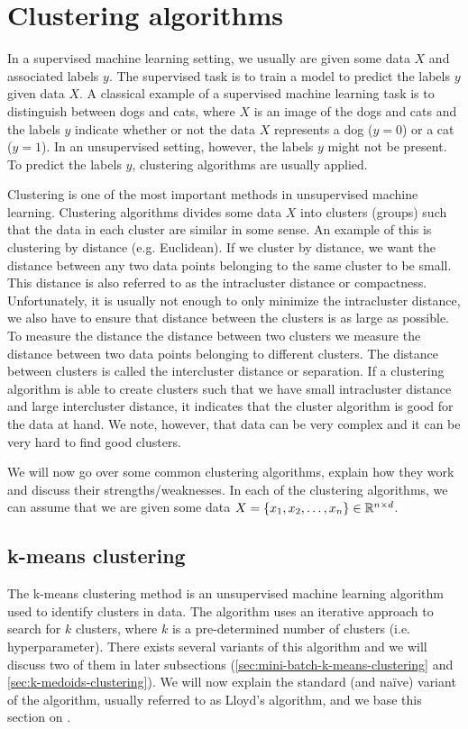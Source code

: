 \section{Clustering algorithms}
\label{sec:clustering-algorithms}
In a supervised machine learning setting, we usually are given some data $X$ and associated labels $y$. The supervised task is to train a model to predict the labels $y$ given data $X$. A classical example of a supervised machine learning task is to distinguish between dogs and cats, where $X$ is an image of the dogs and cats and the labels $y$ indicate whether or not the data $X$ represents a dog ($y=0$) or a cat ($y=1$). In an unsupervised setting, however, the labels $y$ might not be present. To predict the labels $y$, clustering algorithms are usually applied.

Clustering is one of the most important methods in unsupervised machine learning. Clustering algorithms divides some data $X$ into clusters (groups) such that the data in each cluster are similar in some sense. An example of this is clustering by distance (e.g. Euclidean). If we cluster by distance, we want the distance between any two data points belonging to the same cluster to be small. This distance is also referred to as the intracluster distance or compactness. Unfortunately, it is usually not enough to only minimize the intracluster distance, we also have to ensure that distance between the clusters is as large as possible. To measure the distance the distance between two clusters we measure the distance between two data points belonging to different clusters. The distance between clusters is called the intercluster distance or separation. If a clustering algorithm is able to create clusters such that we have small intracluster distance and large intercluster distance, it indicates that the cluster algorithm is good for the data at hand. We note, however, that data can be very complex and it can be very hard to find good clusters.

We will now go over some common clustering algorithms, explain how they work and discuss their strengths/weaknesses. In each of the clustering algorithms, we can assume that we are given some data $X = \left\{x_1, x_2, \ldots, x_n\right\} \in \mathbb{R}^{n \times d}$.

\subsection{k-means clustering}
\label{sec:k-means-clustering}
The k-means clustering method \cite[Section 9.1]{bishop2006} is an unsupervised machine learning algorithm used to identify clusters in data. The algorithm uses an iterative approach to search for $k$ clusters, where $k$ is a pre-determined number of clusters (i.e. hyperparameter). There exists several variants of this algorithm and we will discuss two of them in later subsections (\cref{sec:mini-batch-k-means-clustering} and \cref{sec:k-medoids-clustering}). We will now explain the standard (and naïve) variant of the algorithm, usually referred to as Lloyd's algorithm, and we base this section on \cite[Section 9.1]{bishop2006}.

